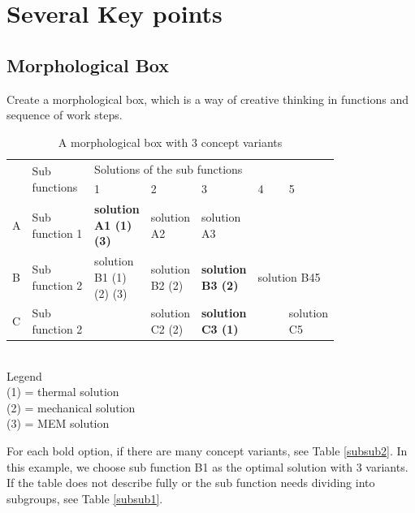 \chapter{Several Key points}
\section{Morphological Box}
Create a morphological box, which is a way of creative thinking in functions and sequence of work steps.
\begin{table}[ht]
	\centering
	\begin{tabular}{lp{0.2\linewidth}p{0.12\linewidth}p{0.12\linewidth}p{0.12\linewidth}p{0.12\linewidth}p{0.12\linewidth}}\toprule
		\multirow{2}{*}{} & \multirow{2}{*}{Sub functions} & \multicolumn{5}{l}{Solutions of the sub functions}\\\cmidrule{3-7}
		& & 1 & 2 & 3 & 4 & 5\\
		\midrule
		A & Sub function 1 & \textbf{solution A1 (1) (3)} & solution A2 & solution A3 & &\\
		B & Sub function 2 & solution B1 (1) (2) (3) & solution B2 (2) & \textbf{solution B3 (2)} & \multicolumn{2}{l}{solution B45} \\
		C & Sub function 2 &  & solution C2 (2)  & \textbf{solution C3 (1)} & & solution C5 \\\bottomrule
	\end{tabular}
	\caption{A morphological box with 3 concept variants}
\end{table}\\
Legend\\
(1) = thermal solution\\
(2) = mechanical solution\\
(3) = MEM solution

For each bold option, if there are many concept variants, see Table \ref{subsub2}. In this example, we choose sub function B1 as the optimal solution with 3 variants. If the table does not describe fully or the sub function needs dividing into subgroups, see Table \ref{subsub1}.


